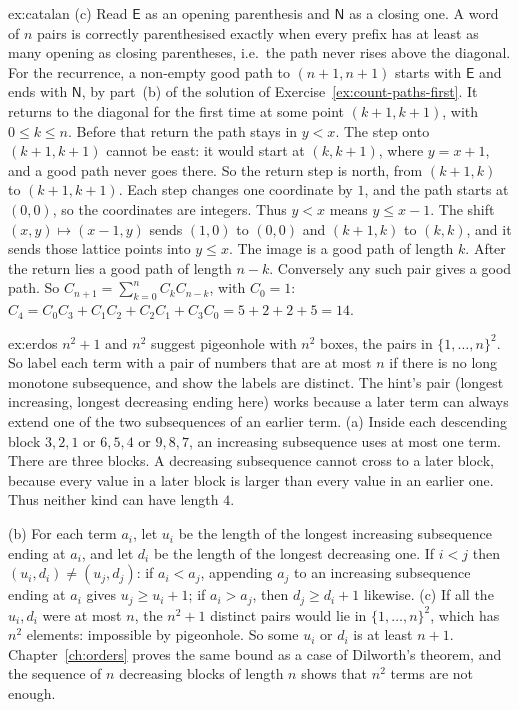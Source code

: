 \begin{solution}{ex:catalan}
(c) Read $\mathsf E$ as an opening parenthesis and $\mathsf N$ as a closing one. A word of $n$ pairs is correctly parenthesised exactly when every prefix has at least as many opening as closing parentheses, i.e.\ the path never rises above the diagonal. For the recurrence, a non-empty good path to $(n+1,n+1)$ starts with $\mathsf E$ and ends with $\mathsf N$, by part~(b) of the solution of Exercise~\ref{ex:count-paths-first}. It returns to the diagonal for the first time at some point $(k+1,k+1)$, with $0\le k\le n$. Before that return the path stays in $y<x$. The step onto $(k+1,k+1)$ cannot be east: it would start at $(k,k+1)$, where $y=x+1$, and a good path never goes there. So the return step is north, from $(k+1,k)$ to $(k+1,k+1)$. Each step changes one coordinate by $1$, and the path starts at $(0,0)$, so the coordinates are integers. Thus $y<x$ means $y\le x-1$. The shift $(x,y)\mapsto(x-1,y)$ sends $(1,0)$ to $(0,0)$ and $(k+1,k)$ to $(k,k)$, and it sends those lattice points into $y\le x$. The image is a good path of length $k$. After the return lies a good path of length $n-k$. Conversely any such pair gives a good path. So $C_{n+1}=\sum_{k=0}^nC_kC_{n-k}$, with $C_0=1$: $C_4=C_0C_3+C_1C_2+C_2C_1+C_3C_0=5+2+2+5=14$.
\end{solution}

\begin{solution}{ex:erdos}
\idea $n^2+1$ and $n^2$ suggest pigeonhole with $n^2$ boxes, the pairs in $\{1,\dots,n\}^2$. So label each term with a pair of numbers that are at most $n$ if there is no long monotone subsequence, and show the labels are distinct. The hint's pair (longest increasing, longest decreasing ending here) works because a later term can always extend one of the two subsequences of an earlier term.
\writeup (a) Inside each descending block $3,2,1$ or $6,5,4$ or $9,8,7$, an increasing subsequence uses at most one term. There are three blocks. A decreasing subsequence cannot cross to a later block, because every value in a later block is larger than every value in an earlier one. Thus neither kind can have length $4$.

(b) For each term $a_i$, let $u_i$ be the length of the longest increasing subsequence ending at $a_i$, and let $d_i$ be the length of the longest decreasing one. If $i<j$ then $(u_i,d_i)\ne(u_j,d_j)$:
if $a_i<a_j$, appending $a_j$ to an increasing subsequence ending at $a_i$ gives $u_j\ge u_i+1$; if $a_i>a_j$, then $d_j\ge d_i+1$ likewise. (c) If all the $u_i,d_i$ were at most $n$, the $n^2+1$ distinct pairs would lie in
$\{1,\dots,n\}^2$, which has $n^2$ elements: impossible by pigeonhole. So some $u_i$ or $d_i$ is at least $n+1$.
Chapter~\ref{ch:orders} proves the same bound as a case of Dilworth's theorem, and the sequence of $n$ decreasing blocks of length $n$ shows that $n^2$ terms are not enough.
\end{solution}

